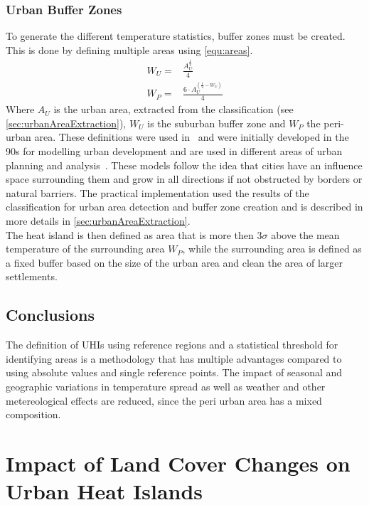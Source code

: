 \documentclass[12pt,a4paper, english,twoside]{scrartcl}
\begin{document}
    \subsubsection{Urban Buffer Zones}\label{sec:urbanBufferzone}
      To generate the different temperature statistics, buffer zones must be created.
      This is done by defining multiple areas using \cref{equ:areas}.
      \begin{equation}\label{equ:areas}
        \begin{split}
          W_U = & \frac{A_U^{\frac{1}{2}}}{4} \\
          W_P = & \frac{6\cdot A_U^{(\frac{1}{2}-W_U)}}{4}
        \end{split}
      \end{equation}
      Where $A_U$ is the urban area, extracted from the classification (see \cref{sec:urbanAreaExtraction}), $W_U$ is the suburban buffer zone and $W_P$ the peri-urban area.
      These definitions were used in~\cite{Sobrino2020} and were initially developed in the 90s for modelling urban development and are used in different areas of urban planning and analysis~\autocite[see]{AlkanBala2014}.
      These models follow the idea that cities have an influence space surrounding them and grow in all directions if not obstructed by borders or natural barriers. 
      The practical implementation used the results of the classification for urban area detection and buffer zone creation and is described in more details in \cref{sec:urbanAreaExtraction}. \\
      The heat island is then defined as area that is more then $3\sigma$ above the mean temperature of the surrounding area $W_P$, while the surrounding area is defined as a fixed buffer based on the size of the urban area and clean the area of larger settlements. 
    \subsection{Conclusions}
    The definition of \glspl{UHI} using reference regions and a statistical threshold for identifying areas is a methodology that has multiple advantages compared to using absolute values and single reference points. 
    The impact of seasonal and geographic variations in temperature spread as well as weather and other metereological effects are reduced, since the peri urban area has a mixed composition. 
\newpage
\section{Impact of Land Cover Changes on Urban Heat Islands}\label{sec:LULC}
\end{document}
